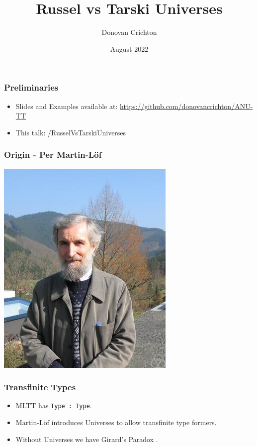 \documentclass[hyperref={colorlinks = true,linkcolor = blue, citecolor = blue, urlcolor = blue}]{beamer}
\title{Russel vs Tarski Universes}
\author{Donovan Crichton}
\date{August 2022}
\begin{document}
 
\frame{\titlepage}

\begin{frame}[fragile]
  \frametitle{Preliminaries}
  \begin{itemize}
  \item Slides and Examples available at:
    \url{https://github.com/donovancrichton/ANU-TT}
  \item This talk: /RusselVsTarskiUniverses
  \end{itemize}
\end{frame}

\begin{frame}[fragile]
\frametitle{Origin - Per Martin-L{\"o}f}
\citep[p. 87-91]{martin1984intuitionistic}
\begin{center}
  \includegraphics[scale=0.5]{PerMartinLof}
\end{center}
\end{frame}

\begin{frame}[fragile]
\frametitle{Transfinite Types}
  \begin{itemize}
    \item MLTT has \texttt{Type : Type}.
    \item Martin-L{\"o}f introduces Universes to allow transfinite type formers.
    \item Without Universes we have Girard's Paradox \citet{girard1972interpretation}.
  \end{itemize}
\end{frame}
\end{document}
